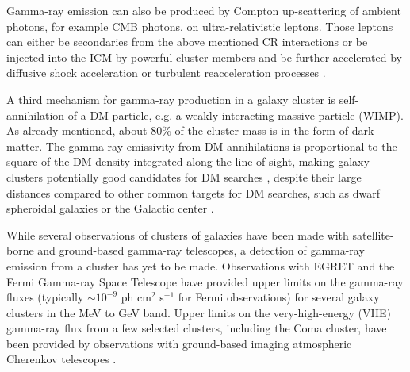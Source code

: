 \documentclass[12pt,manuscript]{aastex}
\begin{document}
Gamma-ray emission can also be produced by Compton up-scattering of ambient photons, for example
CMB photons, on ultra-relativistic leptons. Those leptons can either be secondaries from the above
mentioned CR interactions or be injected into the ICM by powerful cluster members and be further
accelerated by diffusive shock acceleration or turbulent reacceleration processes
\citep[][and references therein]{article:SchlickeiserSieversThiemann:1987}.

A third mechanism for gamma-ray production in a galaxy cluster is self-annihilation of a DM
particle, e.g. a weakly interacting massive particle (WIMP). As already mentioned, about 80\% of
the cluster mass is in the form of dark matter. The gamma-ray emissivity from DM annihilations is
proportional to the square of the DM density integrated along the line of sight, making galaxy clusters
potentially good candidates for DM searches \citep{article:EvansFerrerSarkar:2004,
article:BergstromHooper:2006, article:PinzkePfrommerBergstrom2009, article:Cuesta_etal:2011},
despite their large distances compared to other common targets for DM searches, such as dwarf
spheroidal galaxies \citep{article:Strigari_etal:2007, article:Acciari_etal:2010,article:Aliu_etal:2009}
or the Galactic center \citep{article:Kosack_etal:2004, article:Aharonian_etal:2006,
article:Aharonian_etal:2009b}.

While several observations of clusters of galaxies have been made with satellite-borne and
ground-based gamma-ray telescopes, a detection of gamma-ray emission from a cluster has yet to be
made. Observations with EGRET \citep{article:Sreekumar_etal:1996, article:Reimer_etal:2003} and the
Fermi Gamma-ray Space Telescope \citep{article:Ackermann_etal:2010} have provided upper limits on the
gamma-ray fluxes (typically $\sim10^{-9}$ ph cm$^{2}$ s$^{-1}$ for Fermi observations) for several
galaxy clusters in the MeV to GeV band. Upper limits on the very-high-energy (VHE) gamma-ray flux
from a few selected clusters, including the Coma cluster, have been provided by observations with
ground-based imaging atmospheric Cherenkov telescopes \citep[IACTs;][]{article:Perkins_etal:2006,
inproc:Perkins_etal:2008, article:Aharonian_etal:2009a, article:Aleksic_etal:2010}.
\end{document}
